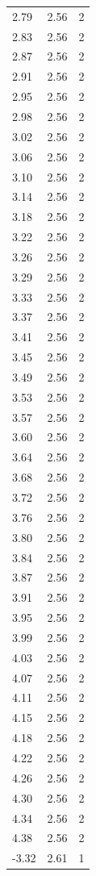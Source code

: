 \begin{longtable}{lrr}
  2.79 & 2.56 & 2 \\
  2.83 & 2.56 & 2 \\
  2.87 & 2.56 & 2 \\
  2.91 & 2.56 & 2 \\
  2.95 & 2.56 & 2 \\
  2.98 & 2.56 & 2 \\
  3.02 & 2.56 & 2 \\
  3.06 & 2.56 & 2 \\
  3.10 & 2.56 & 2 \\
  3.14 & 2.56 & 2 \\
  3.18 & 2.56 & 2 \\
  3.22 & 2.56 & 2 \\
  3.26 & 2.56 & 2 \\
  3.29 & 2.56 & 2 \\
  3.33 & 2.56 & 2 \\
  3.37 & 2.56 & 2 \\
  3.41 & 2.56 & 2 \\
  3.45 & 2.56 & 2 \\
  3.49 & 2.56 & 2 \\
  3.53 & 2.56 & 2 \\
  3.57 & 2.56 & 2 \\
  3.60 & 2.56 & 2 \\
  3.64 & 2.56 & 2 \\
  3.68 & 2.56 & 2 \\
  3.72 & 2.56 & 2 \\
  3.76 & 2.56 & 2 \\
  3.80 & 2.56 & 2 \\
  3.84 & 2.56 & 2 \\
  3.87 & 2.56 & 2 \\
  3.91 & 2.56 & 2 \\
  3.95 & 2.56 & 2 \\
  3.99 & 2.56 & 2 \\
  4.03 & 2.56 & 2 \\
  4.07 & 2.56 & 2 \\
  4.11 & 2.56 & 2 \\
  4.15 & 2.56 & 2 \\
  4.18 & 2.56 & 2 \\
  4.22 & 2.56 & 2 \\
  4.26 & 2.56 & 2 \\
  4.30 & 2.56 & 2 \\
  4.34 & 2.56 & 2 \\
  4.38 & 2.56 & 2 \\
  -3.32 & 2.61 & 1 \\

\end{longtable}

